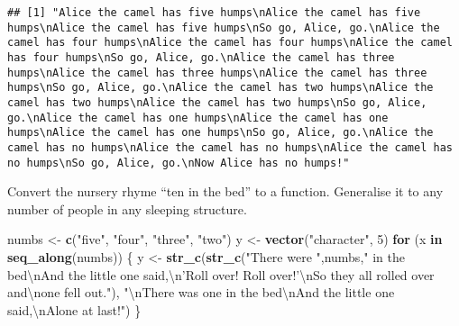 \documentclass[]{article}
\newenvironment{Shaded}{\begin{snugshade}}{\end{snugshade}}
\newcommand{\KeywordTok}[1]{\textcolor[rgb]{0.13,0.29,0.53}{\textbf{#1}}}
\newcommand{\DecValTok}[1]{\textcolor[rgb]{0.00,0.00,0.81}{#1}}
\newcommand{\CharTok}[1]{\textcolor[rgb]{0.31,0.60,0.02}{#1}}
\newcommand{\StringTok}[1]{\textcolor[rgb]{0.31,0.60,0.02}{#1}}
\newcommand{\ControlFlowTok}[1]{\textcolor[rgb]{0.13,0.29,0.53}{\textbf{#1}}}
\newcommand{\NormalTok}[1]{#1}
\begin{document}
\begin{verbatim}
## [1] "Alice the camel has five humps\nAlice the camel has five humps\nAlice the camel has five humps\nSo go, Alice, go.\nAlice the camel has four humps\nAlice the camel has four humps\nAlice the camel has four humps\nSo go, Alice, go.\nAlice the camel has three humps\nAlice the camel has three humps\nAlice the camel has three humps\nSo go, Alice, go.\nAlice the camel has two humps\nAlice the camel has two humps\nAlice the camel has two humps\nSo go, Alice, go.\nAlice the camel has one humps\nAlice the camel has one humps\nAlice the camel has one humps\nSo go, Alice, go.\nAlice the camel has no humps\nAlice the camel has no humps\nAlice the camel has no humps\nSo go, Alice, go.\nNow Alice has no humps!"
\end{verbatim}

Convert the nursery rhyme ``ten in the bed'' to a function. Generalise
it to any number of people in any sleeping structure.

\begin{Shaded}
\begin{Highlighting}[]
\NormalTok{numbs <-}\StringTok{ }\KeywordTok{c}\NormalTok{(}\StringTok{"five"}\NormalTok{, }\StringTok{"four"}\NormalTok{, }\StringTok{"three"}\NormalTok{, }\StringTok{"two"}\NormalTok{)}
\NormalTok{y <-}\StringTok{ }\KeywordTok{vector}\NormalTok{(}\StringTok{"character"}\NormalTok{, }\DecValTok{5}\NormalTok{)}
\ControlFlowTok{for}\NormalTok{ (x }\ControlFlowTok{in} \KeywordTok{seq_along}\NormalTok{(numbs)) \{}
\NormalTok{  y <-}\StringTok{ }\KeywordTok{str_c}\NormalTok{(}\KeywordTok{str_c}\NormalTok{(}\StringTok{"There were "}\NormalTok{,numbs,}\StringTok{" in the bed}\CharTok{\textbackslash{}n}\StringTok{And the little one said,}\CharTok{\textbackslash{}n}\StringTok{'Roll over! Roll over!'}\CharTok{\textbackslash{}n}\StringTok{So they all rolled over and}\CharTok{\textbackslash{}n}\StringTok{one fell out."}\NormalTok{), }\StringTok{"}\CharTok{\textbackslash{}n}\StringTok{There was one in the bed}\CharTok{\textbackslash{}n}\StringTok{And the little one said,}\CharTok{\textbackslash{}n}\StringTok{Alone at last!"}\NormalTok{)}
\NormalTok{\}}
\end{Highlighting}
\end{Shaded}
\end{document}
